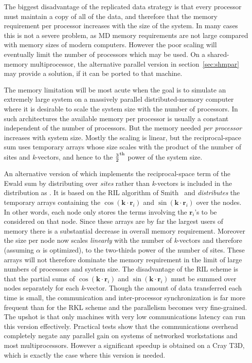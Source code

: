 \documentclass[a4paper,twoside]{report}
\providecommand{\bm}[1]{\mathbf{#1}}
\begin{document}
The biggest disadvantage of the replicated data strategy is that
every processor must maintain a copy of all of the data, and therefore
that the memory requirement per processor increases with the size of
the system.   In many cases this is not a severe problem, as MD
memory requirements are not large compared with memory sizes of modern
computers.  However the poor scaling will eventually limit the number
of processors which may be used.  On a shared-memory multiprocessor,
the alternative parallel version in section~\ref{sec:shmpar} may
provide a solution, if it can be ported to that machine.

The memory limitation will be most acute when the goal is to simulate
an extremely large system on a massively parallel distributed-memory
computer where it is desirable to scale the system size with the
number of processors.  In such architectures the available memory per
processor is usually a constant independent of the number of
processors. But the memory needed \emph{per processor} increases with
system size.  Mostly the scaling is linear, but the reciprocal-space
sum uses temporary arrays whose size scales with the product of the
number of sites and \emph{k}-vectors, and hence to the
{\small$\frac{3}{2}^{\textnormal{th}}$} power of the system size.

An alternative version of  which implements the
reciprocal-space term of the Ewald sum by distributing over
\emph{sites} rather than \emph{k}-vectors is included in the
distribution as .  It is based on the RIL algorithm
of Smith~\cite{smith:92} and \emph{distributes} the temporary arrays
containing the $\cos(\bm{k} \cdot \bm{r}_i)$ and $\sin(\bm{k} \cdot
\bm{r}_i)$ over the nodes. In other words, each node only stores the
terms involving the $\bm{r}_i$'s to be considered on that node.  Since
these arrays are by far the largest users of memory there is a
substantial decrease in overall memory requirement.  Moreover the size
per node now scales \emph{linearly} with the number of
\emph{k}-vectors and therefore (assuming $\alpha$ is optimized), to
the two-thirds power of the number of sites.  These arrays will not
therefore dominate the memory requirement in the limit of large
numbers of processors and system size.  The disadvantage of the RIL
scheme is that the partial sums of $\cos(\bm{k} \cdot \bm{r}_i)$ and
$\sin(\bm{k} \cdot \bm{r}_i)$ must be summed over nodes separately for
each \emph{k}-vector. Though the amount of data transferred each time
is small, the communication and inter-processor synchronization is far
more frequent than for the RKL scheme and the parallelism becomes very
fine-grained.  The upshot is that only machines with very low
communications latency can run this version effectively.  Practical
tests show that the communications overhead completely negate any
parallel gain on systems of networked workstations and most
multiprocessors.  However a significant speedup is obtained on a Cray
T3D, which is exactly the case where this version is needed.
\end{document}
